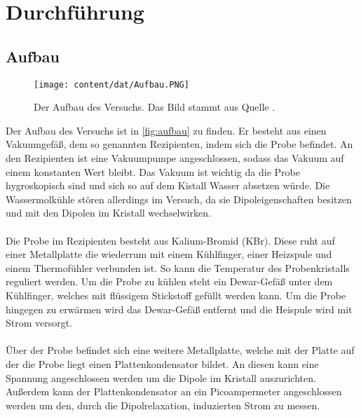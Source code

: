 \section{Durchführung}
\label{sec:Durchführung}
\subsection{Aufbau}

\begin{figure}
    \centering
    \caption{Der Aufbau des Versuchs. Das Bild stammt aus Quelle \cite{anleitung}.}
    \texttt{[image: content/dat/Aufbau.PNG]}
    \label{fig:aufbau}
\end{figure}

Der Aufbau des Versuchs ist in \autoref{fig:aufbau} zu finden.
Er besteht aus einen Vakuumgefäß, dem so genannten Rezipienten, indem sich die Probe befindet.
An den Rezipienten ist eine Vakuumpumpe angeschlossen, sodass das Vakuum auf einem konstanten Wert bleibt.
Das Vakuum ist wichtig da die Probe hygroskopisch sind und sich so auf dem Kistall Wasser absetzen würde.
Die Wassermolkühle stören allerdings im Versuch, da sie Dipoleigenschaften besitzen und mit den Dipolen im Kristall wechselwirken.
\\\\
Die Probe im Rezipienten besteht aus Kalium-Bromid (KBr).
Diese ruht auf einer Metallplatte die wiederrum mit einem Kühlfinger, einer Heizspule und einem Thermofühler verbunden ist.
So kann die Temperatur des Probenkristalls reguliert werden.
Um die Probe zu kühlen steht ein Dewar-Gefäß unter dem Kühlfinger, welches mit flüssigem Stickstoff gefüllt werden kann.
Um die Probe hingegen zu erwärmen wird das Dewar-Gefäß entfernt und die Heispule wird mit Strom versorgt.
\\\\
Über der Probe befindet sich eine weitere Metallplatte, welche mit der Platte auf der die Probe liegt einen Plattenkondensator bildet.
An diesen kann eine Spannung angeschlossen werden um die Dipole im Kristall auszurichten.
Außerdem kann der Plattenkondensator an ein Picoampermeter angeschlossen werden um den, durch die Dipolrelaxation, induzierten Strom zu messen.

